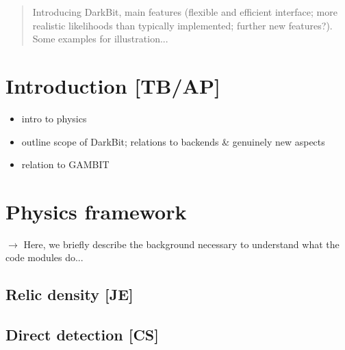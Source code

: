 \date{\today}


\maketitle

\begin{abstract}

Introducing DarkBit, main features (flexible and efficient interface; more realistic likelihoods
than typically implemented; further new features?). 
Some examples for illustration...

\end{abstract}

\section{Introduction {\bf [TB/AP]}}
\label{intro}

\begin{itemize}
\item intro to physics
\item outline scope of DarkBit; relations to backends \& genuinely new aspects
\item relation to GAMBIT
\end{itemize}


\section{Physics framework}
\label{phys}

$\to$ Here, we briefly describe the background necessary to understand what the code modules do...

\subsection{Relic density {\bf [JE]}}
\label{phys_rd}

\subsection{Direct detection {\bf [CS]}}
\label{phys_dd}

